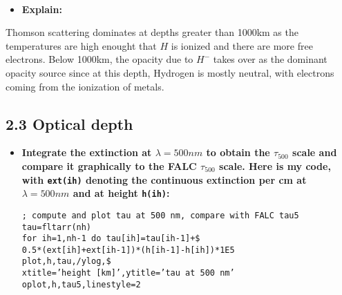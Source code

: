 \documentclass{article}
\providecommand{\tightlist}{%
      \setlength{\itemsep}{0pt}\setlength{\parskip}{0pt}}
\begin{document}
    \begin{center}
    \end{center}
    { \hspace*{\fill} \\}
    
    \begin{itemize}
\tightlist
\item
  \textbf{Explain:}
\end{itemize}

Thomson scattering dominates at depths greater than 1000km as the
temperatures are high enought that \(H\) is ionized and there are more
free electrons. Below 1000km, the opacity due to \(H^-\) takes over as
the dominant opacity source since at this depth, Hydrogen is mostly
neutral, with electrons coming from the ionization of metals.

    \subsection*{2.3 Optical depth}\label{optical-depth}

\begin{itemize}
\item
  \textbf{Integrate the extinction at \(\lambda = 500 nm\) to obtain the
  \(\tau_{500}\) scale and compare it graphically to the FALC
  \(\tau_{500}\) scale. Here is my code, with \texttt{ext(ih)} denoting
  the continuous extinction per cm at \(\lambda = 500 nm\) and at height
  \texttt{h(ih)}:}

\begin{verbatim}
; compute and plot tau at 500 nm, compare with FALC tau5
tau=fltarr(nh)
for ih=1,nh-1 do tau[ih]=tau[ih-1]+$
0.5*(ext[ih]+ext[ih-1])*(h[ih-1]-h[ih])*1E5
plot,h,tau,/ylog,$
xtitle=’height [km]’,ytitle=’tau at 500 nm’
oplot,h,tau5,linestyle=2
\end{verbatim}
\end{itemize}
\end{document}
